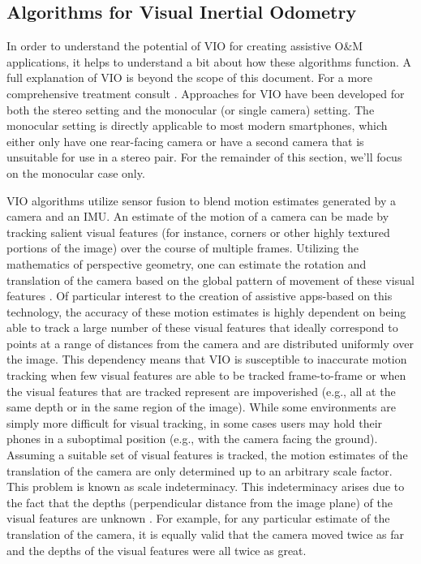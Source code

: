 \documentclass[chi_draft]{sigchi}
\newcommand{\OM}{O\&M\xspace}
\begin{document}
\subsection{Algorithms for Visual Inertial Odometry}
In order to understand the potential of VIO for creating assistive \OM applications, it helps to understand a bit about how these algorithms function.  A full explanation of VIO is beyond the scope of this document.  For a more comprehensive treatment consult \cite{gui2015review}.  Approaches for VIO have been developed for both the stereo setting and the monocular (or single camera) setting.  The monocular setting is directly applicable to most modern smartphones, which either only have one rear-facing camera or have a second camera that is unsuitable for use in a stereo pair.  For the remainder of this section, we'll focus on the monocular case only.

VIO algorithms utilize sensor fusion to blend motion estimates generated by a camera and an IMU.  An estimate of the motion of a camera can be made by tracking salient visual features (for instance, corners or other highly textured portions of the image) over the course of multiple frames.  Utilizing the mathematics of perspective geometry, one can estimate the rotation and translation of the camera based on the global pattern of movement of these visual features \cite{Hartley2004}.  Of particular interest to the creation of assistive apps-based on this technology, the accuracy of these motion estimates is highly dependent on being able to track a large number of these visual features that ideally correspond to points at a range of distances from the camera and are distributed uniformly over the image.  This dependency means that VIO is susceptible to inaccurate motion tracking when few visual features are able to be tracked frame-to-frame or when the visual features that are tracked represent are impoverished (e.g., all at the same depth or in the same region of the image).  While some environments are simply more difficult for visual tracking, in some cases users may hold their phones in a suboptimal position (e.g., with the camera facing the ground).  Assuming a suitable set of visual features is tracked, the motion estimates of the translation of the camera are only determined up to an arbitrary scale factor.  This problem is known as scale indeterminacy.  This indeterminacy arises due to the fact that the depths (perpendicular distance from the image plane) of the visual features are unknown \cite{Hartley2004}.  For example, for any particular estimate of the translation of the camera, it is equally valid that the camera moved twice as far and the depths of the visual features were all twice as great.
\end{document}
